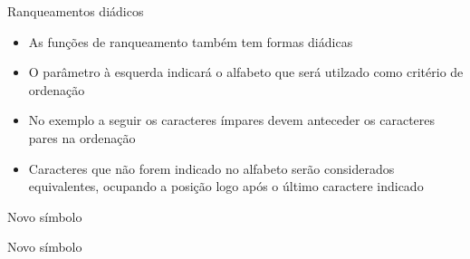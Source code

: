 \begin{frame}[fragile]{Ranqueamentos diádicos}

    \begin{itemize}
        \item As funções de ranqueamento também tem formas diádicas
        \pause

        \item O parâmetro à esquerda indicará o alfabeto  que será utilzado como
            critério de ordenação
        \pause

        \item No exemplo a seguir os caracteres ímpares devem anteceder os caracteres pares na
            ordenação
        \pause

        \item Caracteres que não forem indicado no alfabeto serão considerados equivalentes, 
            ocupando a posição logo após o último caractere indicado
    \end{itemize}

\end{frame}
\begin{frame}[fragile]{Novo símbolo}


\end{frame}

\begin{frame}[fragile]{Novo símbolo}


\end{frame}
